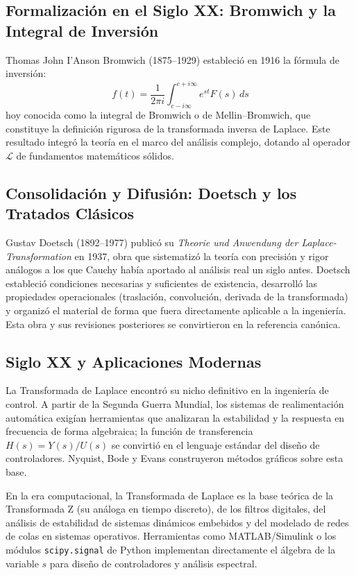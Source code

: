 \documentclass[12pt,letterpaper]{report}
\numberwithin{equation}{chapter}
\numberwithin{figure}{chapter}
\numberwithin{table}{chapter}
\begin{document}
\subsection{Formalización en el Siglo XX: Bromwich y la Integral de Inversión}

Thomas John I'Anson Bromwich (1875–1929) estableció en 1916 la fórmula de inversión:
\[
f(t) = \dfrac{1}{2\pi i}\int_{c - i\infty}^{c + i\infty} e^{st}F(s)\,ds
\]
hoy conocida como la integral de Bromwich o de Mellin–Bromwich, que constituye la definición rigurosa de la transformada inversa de Laplace. Este resultado integró la teoría en el marco del análisis complejo, dotando al operador $\mathcal{L}$ de fundamentos matemáticos sólidos.

\subsection{Consolidación y Difusión: Doetsch y los Tratados Clásicos}

Gustav Doetsch (1892–1977) publicó su \textit{Theorie und Anwendung der Laplace-Transformation} en 1937, obra que sistematizó la teoría con precisión y rigor análogos a los que Cauchy había aportado al análisis real un siglo antes. Doetsch estableció condiciones necesarias y suficientes de existencia, desarrolló las propiedades operacionales (traslación, convolución, derivada de la transformada) y organizó el material de forma que fuera directamente aplicable a la ingeniería. Esta obra y sus revisiones posteriores se convirtieron en la referencia canónica.

\subsection{Siglo XX y Aplicaciones Modernas}

La Transformada de Laplace encontró su nicho definitivo en la ingeniería de control. A partir de la Segunda Guerra Mundial, los sistemas de realimentación automática exigían herramientas que analizaran la estabilidad y la respuesta en frecuencia de forma algebraica; la función de transferencia $H(s) = Y(s)/U(s)$ se convirtió en el lenguaje estándar del diseño de controladores. Nyquist, Bode y Evans construyeron métodos gráficos sobre esta base.

En la era computacional, la Transformada de Laplace es la base teórica de la Transformada Z (su análoga en tiempo discreto), de los filtros digitales, del análisis de estabilidad de sistemas dinámicos embebidos y del modelado de redes de colas en sistemas operativos. Herramientas como MATLAB/Simulink o los módulos \texttt{scipy.signal} de Python implementan directamente el álgebra de la variable $s$ para diseño de controladores y análisis espectral.
\end{document}
